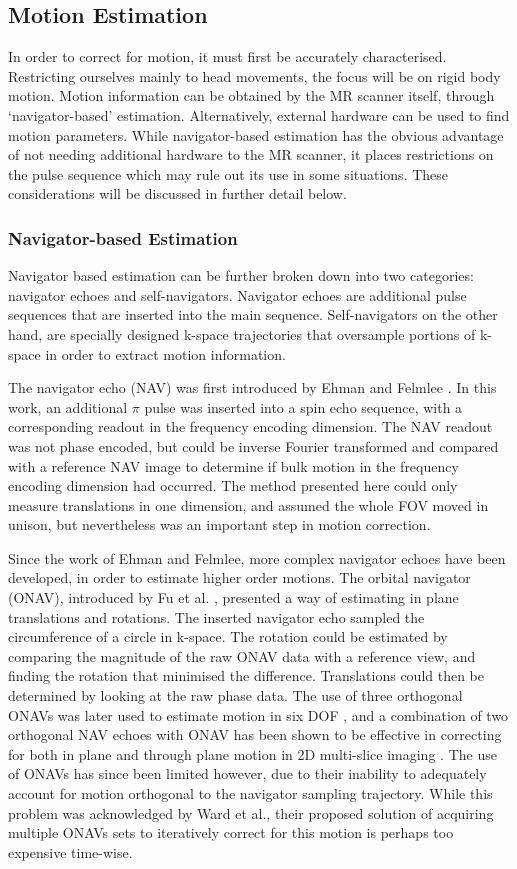 \documentclass[class=article, crop=false]{standalone}
\begin{document}
	
\subsection{Motion Estimation}
In order to correct for motion, it must first be accurately characterised. Restricting ourselves mainly to head movements, the focus will be on rigid body motion. Motion information can be obtained by the MR scanner itself, through `navigator-based' estimation. Alternatively, external hardware can be used to find motion parameters. While navigator-based estimation has the obvious advantage of not needing additional hardware to the MR scanner, it places restrictions on the pulse sequence which may rule out its use in some situations. These considerations will be discussed in further detail below.

\subsubsection*{Navigator-based Estimation}
Navigator based estimation can be further broken down into two categories: navigator echoes and self-navigators. Navigator echoes are additional pulse sequences that are inserted into the main sequence. Self-navigators on the other hand, are specially designed k-space trajectories that oversample portions of k-space in order to extract motion information.
\par
The navigator echo (NAV) was first introduced by Ehman and Felmlee \parencite*{Ehman1989}. In this work, an additional $\pi$ pulse was inserted into a spin echo sequence, with a corresponding readout in the frequency encoding dimension. The NAV readout was not phase encoded, but could be inverse Fourier transformed and compared with a reference NAV image to determine if bulk motion in the frequency encoding dimension had occurred. The method presented here could only measure translations in one dimension, and assumed the whole FOV moved in unison, but nevertheless was an important step in motion correction.
\par
Since the work of Ehman and Felmlee, more complex navigator echoes have been developed, in order to estimate higher order motions. The orbital navigator (ONAV), introduced by Fu et al. \parencite*{ZhuoWuFu1995}, presented a way of estimating in plane translations and rotations. The inserted navigator echo sampled the circumference of a circle in k-space. The rotation could be estimated by comparing the magnitude of the raw ONAV data with a reference view, and finding the rotation that minimised the difference. Translations could then be determined by looking at the raw phase data. The use of three orthogonal ONAVs was later used to estimate motion in six DOF \parencite{Ward2000}, and a combination of two orthogonal NAV echoes with ONAV has been shown to be effective in correcting for both in plane and through plane motion in 2D multi-slice imaging \parencite{Lin2014}. The use of ONAVs has since been limited however, due to their inability to adequately account for motion orthogonal to the navigator sampling trajectory. While this problem was acknowledged by Ward et al., their proposed solution of acquiring multiple ONAVs sets to iteratively correct for this motion is perhaps too expensive time-wise.
\end{document}
